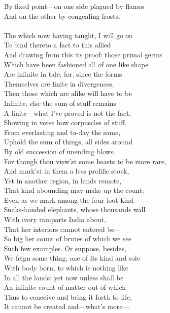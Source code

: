 By fixed point—on one side plagued by flames\\
And on the other by congealing frosts.\\
\\
The which now having taught, I will go on\\
To bind thereto a fact to this allied\\
And drawing from this its proof: those primal germs\\
Which have been fashioned all of one like shape\\
Are infinite in tale; for, since the forms\\
Themselves are finite in divergences,\\
Then those which are alike will have to be\\
Infinite, else the sum of stuff remains\\
A finite—what I've proved is not the fact,\\
Showing in verse how corpuscles of stuff,\\
From everlasting and to-day the same,\\
Uphold the sum of things, all sides around\\
By old succession of unending blows.\\
For though thou view'st some beasts to be more rare,\\
And mark'st in them a less prolific stock,\\
Yet in another region, in lands remote,\\
That kind abounding may make up the count;\\
Even as we mark among the four-foot kind\\
Snake-handed elephants, whose thousands wall\\
With ivory ramparts India about,\\
That her interiors cannot entered be—\\
So big her count of brutes of which we see\\
Such few examples. Or suppose, besides,\\
We feign some thing, one of its kind and sole\\
With body born, to which is nothing like\\
In all the lands: yet now unless shall be\\
An infinite count of matter out of which\\
Thus to conceive and bring it forth to life,\\
It cannot be created and—what's more—\\
